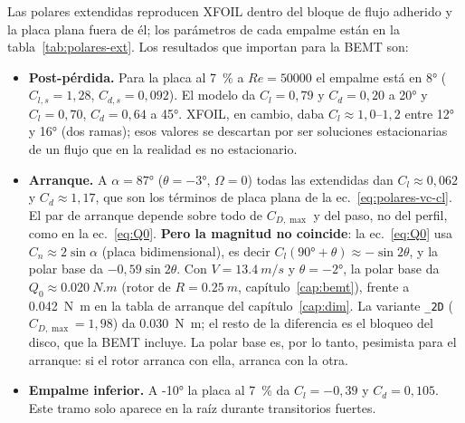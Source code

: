 Las polares extendidas reproducen XFOIL dentro del bloque de flujo adherido y la
placa plana fuera de él; los parámetros de cada empalme están en la
tabla~\ref{tab:polares-ext}. Los resultados que importan para la BEMT son:
\begin{itemize}
  \item \textbf{Post-pérdida.} Para la placa al \SI{7}{\percent} a $Re=\num{50000}$ el
        empalme está en \ang{8} ($C_{l,s}=1{,}28$, $C_{d,s}=0{,}092$). El modelo da
        $C_l=0{,}79$ y $C_d=0{,}20$ a \ang{20} y $C_l=0{,}70$, $C_d=0{,}64$ a \ang{45}.
        XFOIL, en cambio, daba $C_l\approx1{,}0$--$1{,}2$ entre \ang{12} y \ang{16}
        (dos ramas); esos valores se descartan por ser soluciones estacionarias de un
        flujo que en la realidad es no estacionario.
  \item \textbf{Arranque.} A $\alpha=\ang{87}$ ($\theta=\ang{-3}$, $\Omega=0$) todas las
        extendidas dan $C_l\approx0{,}062$ y $C_d\approx1{,}17$, que son los términos de
        placa plana de la ec.~\eqref{eq:polares-vc-cl}. El par de arranque depende sobre
        todo de $C_{D,\max}$ y del paso, no del perfil, como en la ec.~\eqref{eq:Q0}.
        \textbf{Pero la magnitud no coincide}: la ec.~\eqref{eq:Q0} usa $C_n\approx2\sin\alpha$
        (placa bidimensional), es decir $C_l(\ang{90}+\theta)\approx-\sin2\theta$, y la
        polar base da $-0{,}59\sin2\theta$. Con $V=\SI{13.4}{m/s}$ y $\theta=\ang{-2}$, la
        polar base da $Q_0\approx\SI{0.020}{N.m}$ (rotor de $R=\SI{0.25}{m}$, capítulo~\ref{cap:bemt}), frente a \SI{0.042}{N.m} en la tabla
        de arranque del capítulo~\ref{cap:dim}. La variante \texttt{\_2D}
        ($C_{D,\max}=1{,}98$) da \SI{0.030}{N.m}; el resto de la diferencia es el bloqueo del
        disco, que la BEMT incluye. La polar base es, por lo tanto,
        pesimista para el arranque: si el rotor arranca con ella, arranca con la otra.
  \item \textbf{Empalme inferior.} A \ang{-10} la placa al \SI{7}{\percent} da
        $C_l=-0{,}39$ y $C_d=0{,}105$. Este tramo solo aparece en la raíz durante
        transitorios fuertes.
\end{itemize}


